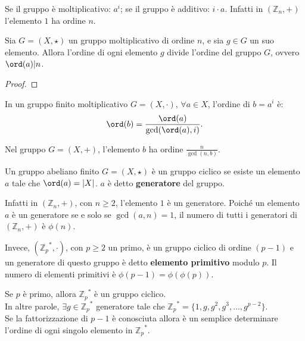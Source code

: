 Se il gruppo è moltiplicativo: $a^i$; se il gruppo è additivo: $i \cdot a$. Infatti in $(\mathbb{Z}_n, +)$ l'elemento $1$ ha ordine $n$. 

\begin{theorem}
    \label{TeoLagrangeGruppi} Sia $G=(X, \star)$ un gruppo moltiplicativo di ordine $n$, e sia $g \in G$ un suo elemento. Allora l'ordine di ogni elemento $g$ divide l'ordine del gruppo $G$, ovvero $\ord(a) |n$.
\end{theorem}

\begin{proof}
\end{proof}

\begin{theorem}
    In un gruppo finito moltiplicativo $G=(X, \cdot)$, $\forall a \in X$, l'ordine di $b=a^i$ è:
    \[
        \ord(b)=\frac{\ord(a)}{\gcd(\ord(a), i)}.
    \]
\end{theorem} 

\begin{corollary}
     Nel gruppo $G=(X, +)$, l'elemento $b$ ha ordine $\frac{n}{\gcd(n,b)}$.
\end{corollary}

\begin{definition}
    Un gruppo abeliano finito $G=(X,\star)$ è un gruppo ciclico se esiste un elemento $a$ tale che $\ord(a)=|X|$. $a$ è detto \textbf{generatore} del gruppo. 
\end{definition} 

\vspace{0.2cm}
Infatti in $(\mathbb{Z}_n, +)$, con $n \geq 2$, l'elemento $1$ è un generatore. Poiché un elemento $a$ è un generatore se e solo se $\gcd(a,n)=1$, il numero di tutti i generatori di $(\mathbb{Z}_n, +)$ è $\phi(n)$.

Invece, $({\mathbb{Z}_p}^*, \cdot)$, con $p \geq 2$ un primo, è un gruppo ciclico di ordine $(p-1)$ e un generatore di questo gruppo è detto \textbf{elemento primitivo} modulo $p$. Il numero di elementi primitivi è $\phi(p-1)=\phi(\phi(p))$. 

\begin{theorem}
    Se $p$ è primo, allora ${\mathbb{Z}_p}^*$ è un gruppo ciclico. \\ In altre parole, $\exists g\in {\mathbb{Z}_p}^*$ generatore tale che ${\mathbb{Z}_p}^*=\{1,g,g^2,g^3,\dots,g^{p-2}\}$. \\ Se la fattorizzazione di $p-1$ è conosciuta allora è un semplice determinare l'ordine di ogni singolo elemento in ${\mathbb{Z}_p}^*$.
\end{theorem}

